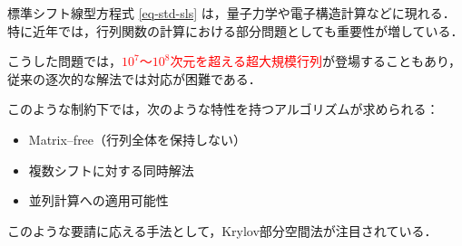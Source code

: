 
標準シフト線型方程式 \eqref{eq-std-sls} は，量子力学や電子構造計算などに現れる．  
特に近年では，行列関数の計算における部分問題としても重要性が増している．

こうした問題では，\textcolor{red}{$10^7$～$10^8$次元を超える超大規模行列}が登場することもあり，従来の逐次的な解法では対応が困難である．

このような制約下では，次のような特性を持つアルゴリズムが求められる：
\begin{itemize}\setlength{\itemsep}{0pt}
  \item Matrix--free（行列全体を保持しない）
  \item 複数シフトに対する同時解法
  \item 並列計算への適用可能性
\end{itemize}
このような要請に応える手法として，Krylov部分空間法が注目されている．
